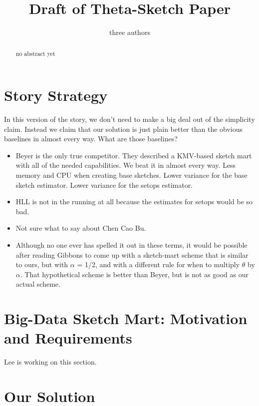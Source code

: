 \documentclass{sig-alternate}
\begin{document}

\title{Draft of Theta-Sketch Paper}

\author{three authors}

\maketitle
\begin{abstract}
no abstract yet
\end{abstract}

\section{Story Strategy}

In this version of the story, we don't need to make a big deal out of the simplicity claim.
Instead we claim that our solution is just plain better
than the obvious baselines in almost every way. What are those baselines?

\begin{itemize}
\item Beyer is the only true competitor. They described a KMV-based sketch mart with all of the needed capabilities.
We beat it in almost every way.  Less memory and CPU when creating base sketches. Lower variance for the base sketch estimator. Lower variance for
the setops estimator.
\item HLL is not in the running at all because the estimates for setops would be so bad.
\item Not sure what to say about Chen Cao Bu.
\item Although no one ever has spelled it out in these terms, it would be possible after reading Gibbons to come up with a sketch-mart scheme that is similar to ours, but with $\alpha$ = 1/2,
and with a different rule for when to multiply $\theta$ by $\alpha$. That hypothetical scheme is better than Beyer, but is not as good as our actual scheme.
\end{itemize}

\section{Big-Data Sketch Mart: Motivation and Requirements}

Lee is working on this section.

\section{Our Solution}
\end{document}
